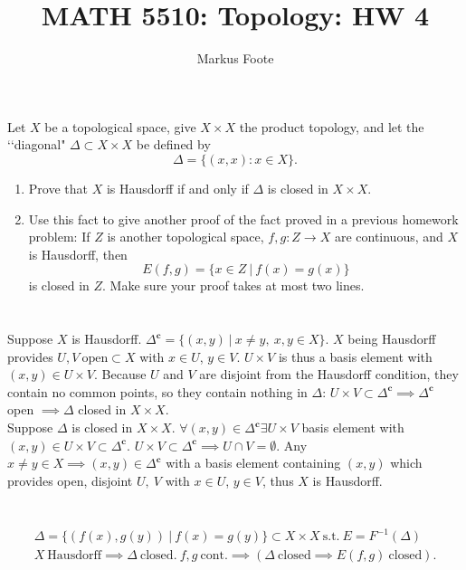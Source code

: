\documentclass{jhwhw}
\title{MATH 5510: Topology: HW 4}
\author{Markus Foote}
\begin{document}
\problem{}%
Let $X$ be a topological space, give $X\times X$ the product topology, and let the \lq\lq diagonal"  $\Delta\subset X\times X$ be defined by 
$$
\Delta =\{ (x,x): x\in X\}.
$$
\begin{enumerate}
	
	\item Prove that $X$ is Hausdorff if and only if $\Delta$ is closed in $X\times X$.
	
	\item Use this fact to give another proof of the fact proved in a previous homework problem:  If $Z$ is another topological space, $f,g:Z\to X$ are continuous, and $X$ is Hausdorff, then
	$$
	E(f,g) = \{x\in Z \ | \ f(x) = g(x)\}
	$$ 
	is closed in $Z$.  Make sure your proof takes at most two lines.
\end{enumerate}
\solution{}
\part{}
Suppose $X$ is Hausdorff. $\Delta^{\mathbf{c}}=\{(x,y)\ | \ x\ne y,\ x,y\in X\}$. $X$ being Hausdorff provides $U,V\ \mathrm{ open }\subset X$ with $x\in U$, $y\in V$. $U\times V$ is thus a basis element with $(x,y) \in U\times V$. Because $U$ and $V$ are disjoint from the Hausdorff condition, they contain no common points, so they contain nothing in $\Delta$: $U\times V \subset \Delta^{\mathbf{c}}\implies \Delta^{\mathbf{c}}$ open $\implies \Delta$ closed in $X\times X$.
\\

Suppose $\Delta$ is closed in $X\times X$. $\forall (x,y)\in \Delta^{\mathbf{c}} \exists U\times V$ basis element with $(x,y)\in U\times V \subset \Delta^{\mathbf{c}}$. $U\times V \subset \Delta^{\mathbf{c}} \implies U\cap V=\emptyset$. Any $x\ne y\in X \implies (x,y)\in \Delta^{\mathbf{c}}$ with a basis element containing $(x,y)$ which provides open, disjoint $U,\ V$ with $x\in U$, $y\in V$, thus $X$ is Hausdorff.


\part{}
\begin{gather}
\Delta = \{(f(x),g(y))\ | \ f(x) = g(y)\} \subset X \times X \ \mathrm{ s.t. }\ E = F^{-1}(\Delta) \\
X \ \mathrm{Hausdorff}\implies \Delta \ \mathrm{closed.} \ f,g \ \mathrm{cont.} \implies \left( \Delta\ \mathrm{closed} \implies E(f,g)\ \mathrm{ closed} \right).
\end{gather}
\\
\end{document}
